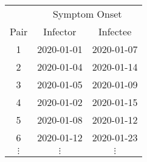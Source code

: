 {\tiny
\begin{tabular}{ccc}
	\toprule
	         & \multicolumn{2}{c}{Symptom Onset} \\
	\cmidrule(rl){2-3}
	  Pair   &  Infector  &       Infectee       \\
	\midrule
	   1     & 2020-01-01 &      2020-01-07      \\
	   2     & 2020-01-04 &      2020-01-14      \\
	   3     & 2020-01-05 &      2020-01-09      \\
	   4     & 2020-01-02 &      2020-01-15      \\
	   5     & 2020-01-08 &      2020-01-12      \\
	   6     & 2020-01-12 &      2020-01-23      \\
	$\vdots$ &  $\vdots$  &       $\vdots$       \\
	\bottomrule
\end{tabular}
}